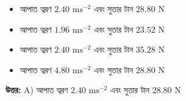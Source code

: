 \documentclass[12pt, a4paper]{article}
\begin{document}
\begin{center}
\end{center}
\vspace{1em}

\begin{itemize}[label={}, leftmargin=1cm, itemsep=0.5em]
    \item[\textbf{A)}] আপাত ত্বরণ $2.40\text{ ms}^{-2}$ এবং সুতার টান $28.80\text{ N}$
    \item[\textbf{B)}] আপাত ত্বরণ $1.96\text{ ms}^{-2}$ এবং সুতার টান $23.52\text{ N}$
    \item[\textbf{C)}] আপাত ত্বরণ $2.40\text{ ms}^{-2}$ এবং সুতার টান $35.28\text{ N}$
    \item[\textbf{D)}] আপাত ত্বরণ $4.80\text{ ms}^{-2}$ এবং সুতার টান $28.80\text{ N}$
\end{itemize}

\vspace{0.5em}
\begin{tcolorbox}[answerbox]
    \textbf{\color{success} উত্তর:} A) আপাত ত্বরণ $2.40\text{ ms}^{-2}$ এবং সুতার টান $28.80\text{ N}$
\end{tcolorbox}
\vspace{1em}
\end{document}
